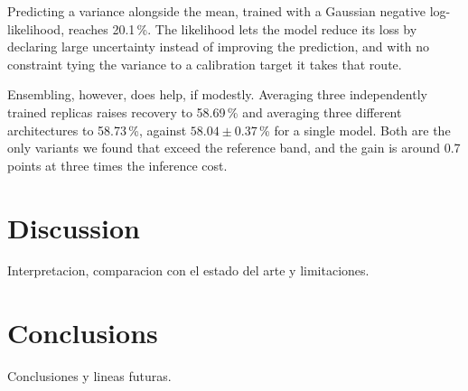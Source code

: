 \documentclass[10pt,conference]{IEEEtran}
\begin{document}
Predicting a variance alongside the mean, trained with a Gaussian negative
log-likelihood, reaches 20.1\,\%. The likelihood lets the model reduce its loss
by declaring large uncertainty instead of improving the prediction, and with no
constraint tying the variance to a calibration target it takes that route.

Ensembling, however, does help, if modestly. Averaging three independently
trained replicas raises recovery to 58.69\,\% and averaging three different
architectures to 58.73\,\%, against $58.04 \pm 0.37$\,\% for a single model.
Both are the only variants we found that exceed the reference band, and the
gain is around 0.7 points at three times the inference cost.


\section{Discussion}

Interpretacion, comparacion con el estado del arte y limitaciones.


\section{Conclusions}

Conclusiones y lineas futuras.




\end{document}
